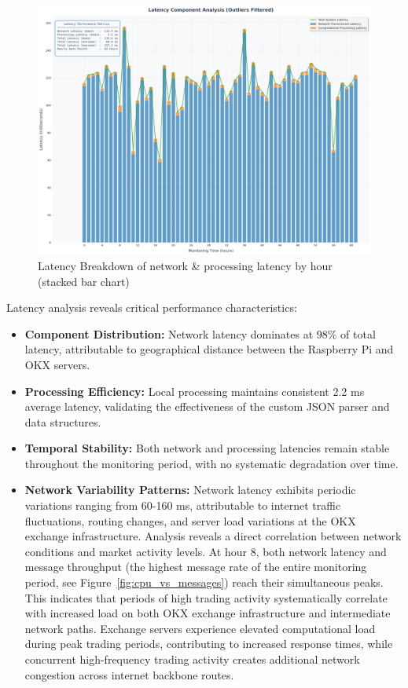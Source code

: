 \documentclass[12pt,a4paper]{article}
\begin{document}
\begin{figure}[H]
    \centering
    \includegraphics[width=\textwidth]{../plots/62-hours/network_processing_latency_breakdown.png}
    \caption{Latency Breakdown of network \& processing latency by hour (stacked bar chart)}
    \label{fig:latency_breakdown}
\end{figure}

Latency analysis reveals critical performance characteristics:

\begin{itemize}
    \item \textbf{Component Distribution:} Network latency dominates at 98\% of total latency, attributable to geographical distance between the Raspberry Pi and OKX servers.
    
    \item \textbf{Processing Efficiency:} Local processing maintains consistent 2.2 ms average latency, validating the effectiveness of the custom JSON parser and data structures.

    \item \textbf{Temporal Stability:} Both network and processing latencies remain stable throughout the monitoring period, with no systematic degradation over time.
    
    \item \textbf{Network Variability Patterns:} Network latency exhibits periodic variations ranging from 60-160 ms, attributable to internet traffic fluctuations, routing changes, and server load variations at the OKX exchange infrastructure. Analysis reveals a direct correlation between network conditions and market activity levels. At hour 8, both network latency and message throughput (the highest message rate of the entire monitoring period, see Figure~\ref{fig:cpu_vs_messages}) reach their simultaneous peaks. This indicates that periods of high trading activity systematically correlate with increased load on both OKX exchange infrastructure and intermediate network paths. Exchange servers experience elevated computational load during peak trading periods, contributing to increased response times, while concurrent high-frequency trading activity creates additional network congestion across internet backbone routes.

\end{itemize}
\end{document}
